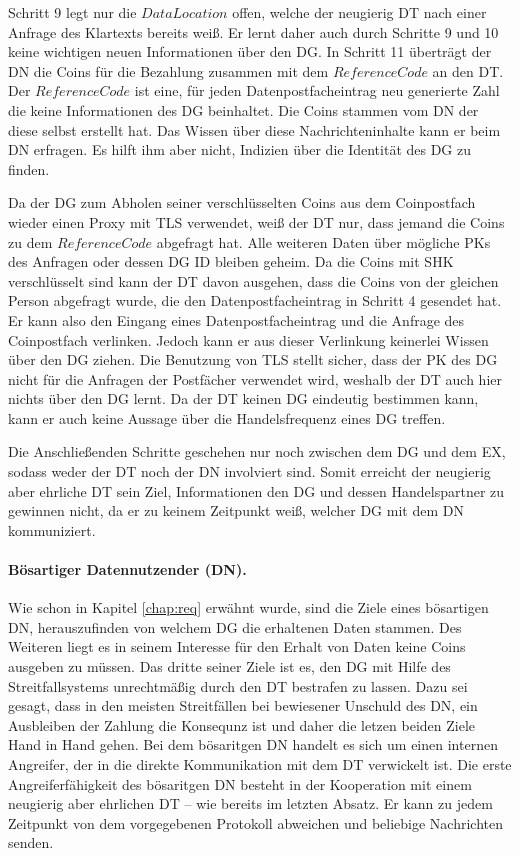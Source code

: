 \documentclass[
	fontsize=11pt,
	headings=small,
	parskip=half,           %
	bibliography=totoc,
	numbers=noenddot,       %
	open=any,               %
]{scrreprt}
\begin{document}
Schritt 9 legt nur die $DataLocation$ offen, welche der neugierig DT nach einer Anfrage des Klartexts bereits weiß. Er lernt daher auch durch Schritte 9 und 10 keine wichtigen neuen Informationen über den DG. In Schritt 11 überträgt der DN die Coins für die Bezahlung zusammen mit dem $ReferenceCode$ an den DT. Der $ReferenceCode$ ist eine, für jeden Datenpostfacheintrag neu generierte Zahl die keine Informationen des DG beinhaltet. Die Coins stammen vom DN der diese selbst erstellt hat. Das Wissen über diese Nachrichteninhalte kann er beim DN erfragen. Es hilft ihm aber nicht, Indizien über die Identität des DG zu finden.

Da der DG zum Abholen seiner verschlüsselten Coins aus dem Coinpostfach wieder einen Proxy mit TLS verwendet, weiß der DT nur, dass jemand die Coins zu dem $ReferenceCode$ abgefragt hat. Alle weiteren Daten über mögliche PKs des Anfragen oder dessen DG ID bleiben geheim. Da die Coins mit SHK verschlüsselt sind kann der DT davon ausgehen, dass die Coins von der gleichen Person abgefragt wurde, die den Datenpostfacheintrag in Schritt 4 gesendet hat. Er kann also den Eingang eines Datenpostfacheintrag und die Anfrage des Coinpostfach verlinken. Jedoch kann er aus dieser Verlinkung keinerlei Wissen über den DG ziehen. Die Benutzung von TLS stellt sicher, dass der PK des DG nicht für die Anfragen der Postfächer verwendet wird, weshalb der DT auch hier nichts über den DG lernt. Da der DT keinen DG eindeutig bestimmen kann, kann er auch keine Aussage über die Handelsfrequenz eines DG treffen.

Die Anschließenden Schritte geschehen nur noch zwischen dem DG und dem EX, sodass weder der DT noch der DN involviert sind. Somit erreicht der neugierig aber ehrliche DT sein Ziel, Informationen den DG und dessen Handelspartner zu gewinnen nicht, da er zu keinem Zeitpunkt weiß, welcher DG mit dem DN kommuniziert.

\paragraph{Bösartiger Datennutzender (DN).}
Wie schon in Kapitel \ref{chap:req} erwähnt wurde, sind die Ziele eines bösartigen DN, herauszufinden von welchem DG die erhaltenen Daten stammen. Des Weiteren liegt es in seinem Interesse für den Erhalt von Daten keine Coins ausgeben zu müssen. Das dritte seiner Ziele ist es, den DG mit Hilfe des Streitfallsystems unrechtmäßig durch den DT bestrafen zu lassen. Dazu sei gesagt, dass in den meisten Streitfällen bei bewiesener Unschuld des DN, ein Ausbleiben der Zahlung die Konsequnz ist und daher die letzen beiden Ziele Hand in Hand gehen. Bei dem bösaritgen DN handelt es sich um einen internen Angreifer, der in die direkte Kommunikation mit dem DT verwickelt ist. Die erste Angreiferfähigkeit des bösaritgen DN besteht in der Kooperation mit einem neugierig aber ehrlichen DT -- wie bereits im letzten Absatz. Er kann zu jedem Zeitpunkt von dem vorgegebenen Protokoll abweichen und beliebige Nachrichten senden.
\end{document}
